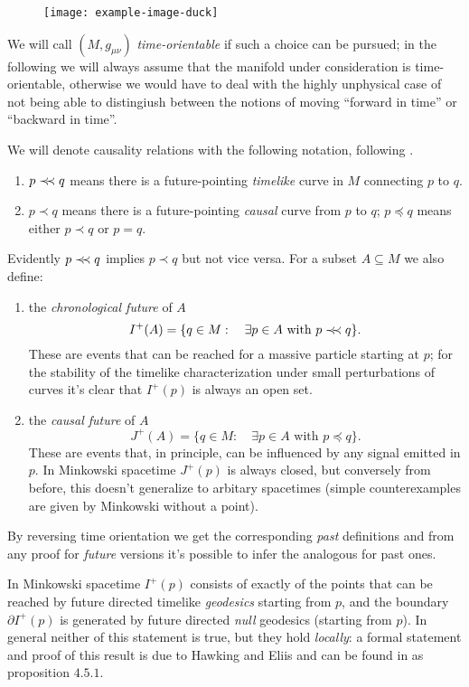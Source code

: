 \begin{figure}
	\centering
	\texttt{[image: example-image-duck]}
\end{figure}
We will call \((M, g_{\mu\nu})\) \emph{time-orientable} if such a  choice can be pursued; in the following we will always assume that the manifold under consideration is time-orientable, otherwise we would have to deal with the highly unphysical case of not being able to distingiush between the notions of moving ``forward in time'' or ``backward in time''.

We will denote causality relations with the following notation, following \cite{o1983semi}.
\begin{enumerate}
	\item  \(p \prec\mathrel{\mkern-5mu}\prec q\) means there is a future-pointing \emph{timelike} curve in \(M\) connecting \(p\) to \(q\).
	\item \(p \prec q\) means there is a future-pointing \emph{causal} curve from \(p\) to \(q\); \(p \preceq q\) means either \(p \prec q\) or \(p = q\).
\end{enumerate}

Evidently \(p\prec\mathrel{\mkern-5mu}\prec q\) implies \(p\prec q\) but not vice versa. For a subset \(A \subseteq M\) we also define:
\begin{enumerate}
	\item the \emph{chronological future} of \(A\)
	\[
	I^+(A) =\{ q\in M :\quad\exists p \in A\text{ with } p\prec\mathrel{\mkern-5mu}\prec q\}.
	\]
	These are events that can be reached for a massive particle starting at \(p\); for the stability of the timelike characterization under small perturbations of curves it's clear that \(I^+(p)\) is always an open set.
	\item the \emph{causal future} of \(A\)
	\[
	J^+(A) =\{ q\in M : \quad\exists p \in A\text{ with } p\preceq q\}.
	\]
	These are events that, in principle, can be influenced by any signal emitted in \(p\). In Minkowski spacetime \(J^+(p)\) is always closed, but conversely from before, this doesn't generalize to arbitary spacetimes (simple counterexamples are given by Minkowski without a point).
\end{enumerate}
By reversing time orientation we get the corresponding \emph{past} definitions and from any proof for \emph{future} versions it's possible to infer the analogous for past ones.

In Minkowski spacetime \(I^+(p)\) consists of exactly of the points that can be reached by future directed timelike \emph{geodesics} starting from \(p\), and the boundary \(\partial I^+(p)\) is generated by future directed \emph{null} geodesics (starting from \(p\)). In general neither of this statement is true, but they hold \emph{locally}: a formal statement and proof of this result is due to Hawking and Eliis and can be found in \cite{hawking1973large} as proposition \(4.5.1\).

